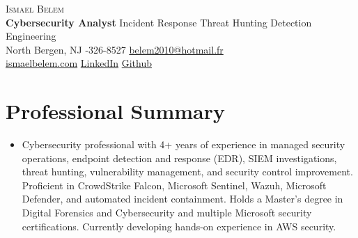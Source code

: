 \documentclass[a4paper,10pt]{article}
\begin{document}

\begin{center}
  {\Huge \scshape Ismael Belem} \\ \vspace{3pt}
  {\large \textbf{Cybersecurity Analyst} \textbar{} Incident Response \textbar{} Threat Hunting \textbar{} Detection Engineering} \\ \vspace{4pt}
  \small
  North Bergen, NJ \;\textbar{}-326-8527 \;\textbar\;
  \href{mailto:belem2010@hotmail.fr}{belem2010@hotmail.fr} \\
  \href{https://www.ismaelbelem.com}{ismaelbelem.com} \;\textbar\;
  \href{https://www.linkedin.com/in/ismael-belem-95bb08173/}{LinkedIn} \;\textbar\;
  \href{https://github.com/Ibelem1}{Github}
\end{center}
\vspace{-8pt}

\section{Professional Summary}
\begin{itemize}[leftmargin=0.4cm, label={}]
  \item \small{Cybersecurity professional with 4+ years of experience in managed security operations, endpoint detection and response (EDR), SIEM investigations, threat hunting, vulnerability management, and security control improvement. Proficient in CrowdStrike Falcon, Microsoft Sentinel, Wazuh, Microsoft Defender, and automated incident containment. Holds a Master's degree in Digital Forensics and Cybersecurity and multiple Microsoft security certifications. Currently developing hands-on experience in AWS security.}
\end{itemize}

\end{document}
